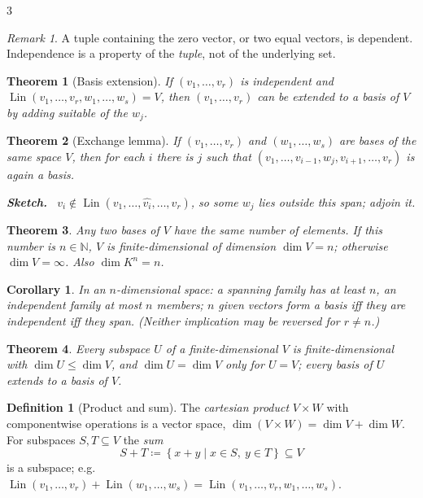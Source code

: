 \documentclass[10pt,a4paper,landscape]{article}
\theoremstyle{definition}
\newtheorem{defn}{Definition}[section]
\theoremstyle{plain}
\newtheorem{thm}{Theorem}[section]
\newtheorem{cor}{Corollary}[section]
\theoremstyle{remark}
\newtheorem{rem}{Remark}[section]
\newcommand{\N}{\mathbb{N}}
\newcommand{\set}[1]{\left\{ #1 \right\}}
\newcommand{\oo}{\infty}
\newcommand{\deq}{\coloneqq}
\DeclareMathOperator{\Lin}{Lin}
\newenvironment{proofsketch}{%
  \par\small\color{exgray}\textbf{Sketch.}\ }%
  {\par}
\begin{document}
\begin{multicols*}{3}
\begin{rem}
A tuple containing the zero vector, or two equal vectors, is dependent. Independence is a property of the \emph{tuple}, not of the underlying set.
\end{rem}

\begin{thm}[Basis extension]
If $(v_1, \dots, v_r)$ is independent and $\Lin(v_1, \dots, v_r, w_1, \dots, w_s) = V$, then $(v_1, \dots, v_r)$ can be extended to a basis of $V$ by adding suitable of the $w_j$.
\end{thm}

\begin{thm}[Exchange lemma]
If $(v_1, \dots, v_r)$ and $(w_1, \dots, w_s)$ are bases of the same space $V$, then for each $i$ there is $j$ such that $(v_1, \dots, v_{i-1}, w_j, v_{i+1}, \dots, v_r)$ is again a basis.
\begin{proofsketch}
$v_i \notin \Lin(v_1, \dots, \widehat{v_i}, \dots, v_r)$, so some $w_j$ lies outside this span; adjoin it.
\end{proofsketch}
\end{thm}

\begin{thm}
Any two bases of $V$ have the same number of elements. If this number is $n \in \N$, $V$ is \emph{finite-dimensional} of \emph{dimension} $\dim V = n$; otherwise $\dim V = \oo$. Also $\dim K^n = n$.
\end{thm}

\begin{cor}
In an $n$-dimensional space: a spanning family has at least $n$, an independent family at most $n$ members; $n$ given vectors form a basis iff they are independent iff they span. (Neither implication may be reversed for $r \neq n$.)
\end{cor}

\begin{thm}
Every subspace $U$ of a finite-dimensional $V$ is finite-dimensional with $\dim U \le \dim V$, and $\dim U = \dim V$ only for $U = V$; every basis of $U$ extends to a basis of $V$.
\end{thm}

\begin{defn}[Product and sum]
The \emph{cartesian product} $V \times W$ with componentwise operations is a vector space, $\dim(V \times W) = \dim V + \dim W$. For subspaces $S, T \subseteq V$ the \emph{sum}
\[
S + T \deq \set{x + y \mid x \in S,\ y \in T} \subseteq V
\]
is a subspace; e.g.\ $\Lin(v_1,\dots,v_r) + \Lin(w_1,\dots,w_s) = \Lin(v_1,\dots,v_r,w_1,\dots,w_s)$.
\end{defn}


\end{multicols*}
\end{document}

